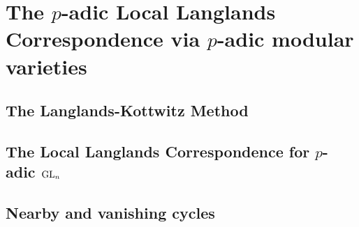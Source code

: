     \part{The \texorpdfstring{$p$}{}-adic Local Langlands Correspondence via \texorpdfstring{$p$}{}-adic modular varieties}
        \chapter{The Langlands-Kottwitz Method}
            \begin{abstract}
                    
            \end{abstract}
            
            \minitoc
            
            
            
            
            
        \chapter{The Local Langlands Correspondence for \texorpdfstring{$p$}{}-adic \texorpdfstring{$\operatorname{GL}_n$}{}}
            \begin{abstract}
                    
            \end{abstract}
            
            \minitoc
        
    \begin{appendices}
        \chapter{Nearby and vanishing cycles}
            \begin{abstract}
                
            \end{abstract}
            
            \minitoc
            
            
            
            
    \end{appendices}
	
	\printbibliography

